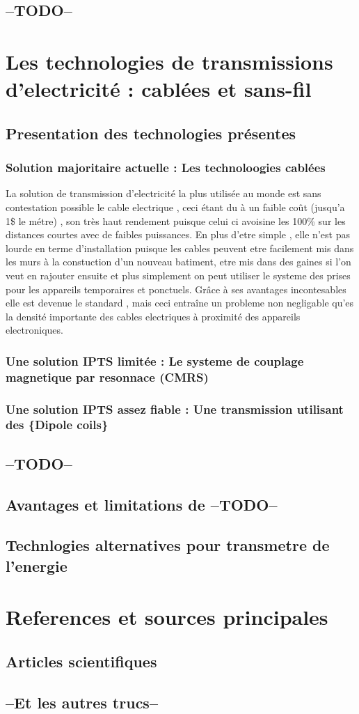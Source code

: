 \documentclass[12pt]{report}
\begin{document}
\section{--TODO--}

\chapter{Les technologies de transmissions d'electricité : cablées et sans-fil} %
\section{Presentation des technologies présentes}
\subsection{Solution majoritaire actuelle : Les technoloogies cablées}
	La solution de transmission d'electricité la plus utilisée au monde est sans contestation possible le cable electrique , ceci étant du à un faible coût (jusqu'a 1\$ le métre) , son très haut rendement puisque celui ci avoisine les 100\% sur les distances courtes avec de faibles puissances. En plus d'etre simple , elle n'est pas lourde en terme d'installation puisque les cables peuvent etre facilement mis dans les murs à la constuction d'un nouveau batiment, etre mis dans des gaines si l'on veut en rajouter ensuite et plus simplement on peut utiliser le systeme des prises pour les appareils temporaires et ponctuels. Grâce à ses avantages incontesables elle est devenue le standard , mais ceci entraîne un probleme non negligable qu'es la densité importante des cables electriques à proximité des appareils electroniques. %
\subsection{Une solution IPTS limitée : Le systeme de couplage magnetique par resonnace (CMRS)}
\subsection{Une solution IPTS assez fiable : Une transmission utilisant des \{Dipole coils\}}
\section{--TODO--} %
\section{Avantages et limitations de --TODO--}
\section{Technlogies alternatives pour transmetre de l'energie}

\chapter{References et sources principales}
\section{Articles scientifiques}
\section{--Et les autres trucs--}
\end{document}
